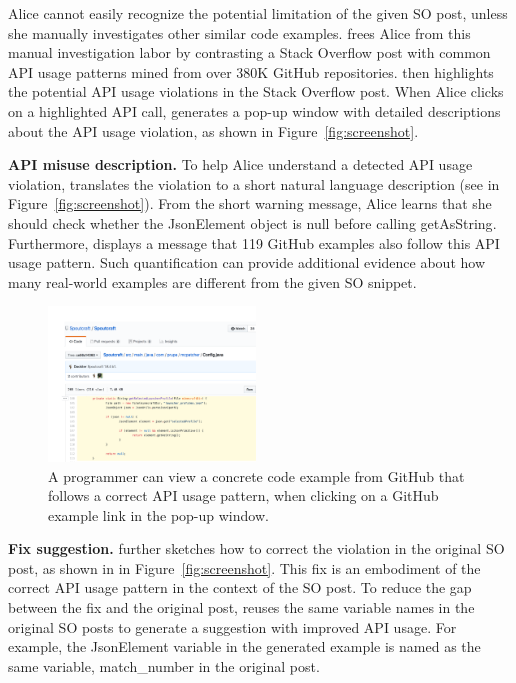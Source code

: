Alice cannot easily recognize the potential limitation of the given SO post, unless she manually investigates other similar code examples. {\tool} frees Alice from this manual investigation labor by contrasting a Stack Overflow post with common API usage patterns mined from over 380K GitHub repositories. {\tool} then highlights the potential API usage violations in the Stack Overflow post. When Alice clicks on a highlighted API call, {\tool} generates a pop-up window with detailed descriptions about the API usage violation, as shown in Figure~\ref{fig:screenshot}.

{\bf API misuse description.} To help Alice understand a detected API usage violation, {\tool} translates the violation to a short natural language description (see  in Figure~\ref{fig:screenshot}). From the short warning message, Alice learns that she should check whether the {\ttt JsonElement} object is {\ttt null} before calling {\ttt getAsString}. Furthermore, {\tool} displays a message that 119 GitHub examples also follow this API usage pattern. Such quantification can provide additional evidence about how many real-world examples are different from the given SO snippet.

\begin{figure}
\centering
\includegraphics[width=0.49\textwidth]{github-example-v3.pdf}
  \caption{A programmer can view a concrete code example from GitHub that follows a correct API usage pattern, when clicking on a GitHub example link in the pop-up window.\protect\footnotemark}
  \label{fig:github}
\end{figure}


{\bf Fix suggestion.} {\tool} further sketches how to correct the violation in the original SO post, as shown in  in Figure~\ref{fig:screenshot}. This fix is an embodiment of the correct API usage pattern in the context of the SO post. To reduce the gap between the fix and the original post, {\tool} reuses the same variable names in the original SO posts to generate a suggestion with improved API usage. For example, the {\ttt JsonElement} variable in the generated example is named as the same variable, {\ttt match\_number} in the original post.

